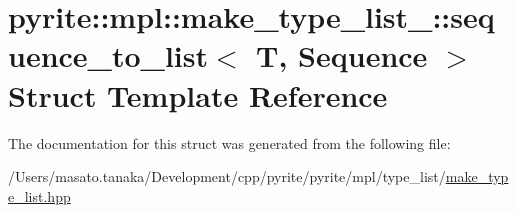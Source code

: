 \hypertarget{structpyrite_1_1mpl_1_1make__type__list___1_1sequence__to__list}{}\section{pyrite\+:\+:mpl\+:\+:make\+\_\+type\+\_\+list\+\_\+\+:\+:sequence\+\_\+to\+\_\+list$<$ T, Sequence $>$ Struct Template Reference}
\label{structpyrite_1_1mpl_1_1make__type__list___1_1sequence__to__list}


The documentation for this struct was generated from the following file\+:\begin{DoxyCompactItemize}
\item 
/\+Users/masato.\+tanaka/\+Development/cpp/pyrite/pyrite/mpl/type\+\_\+list/\mbox{\hyperlink{make__type__list_8hpp}{make\+\_\+type\+\_\+list.\+hpp}}\end{DoxyCompactItemize}
